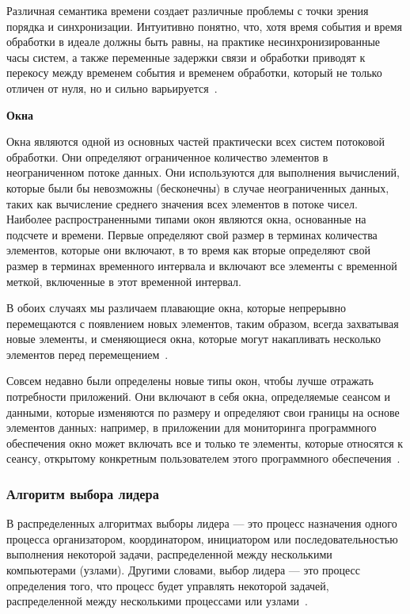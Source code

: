 Различная семантика времени создает различные проблемы с точки зрения порядка и синхронизации. 
Интуитивно понятно, что, хотя время события и время обработки в идеале должны быть равны, на практике несинхронизированные часы систем, а также переменные задержки связи и обработки приводят к перекосу между временем события и временем обработки, который не только отличен от нуля, но и сильно варьируется~\cite{10.14778/2824032.2824076}.

\textbf{Окна}

Окна являются одной из основных частей практически всех систем потоковой обработки. 
Они определяют ограниченное количество элементов в неограниченном потоке данных. 
Они используются для выполнения вычислений, которые были бы невозможны (бесконечны) в случае неограниченных данных, таких как вычисление среднего значения всех элементов в потоке чисел. 
Наиболее распространенными типами окон являются окна, основанные на подсчете и времени. 
Первые определяют свой размер в терминах количества элементов, которые они включают, в то время как вторые определяют свой размер в терминах временного интервала и включают все элементы с временной меткой, включенные в этот временной интервал. 

В обоих случаях мы различаем плавающие окна, которые непрерывно перемещаются с появлением новых элементов, таким образом, всегда захватывая новые элементы, и сменяющиеся окна, которые могут накапливать несколько элементов перед перемещением~\cite{10.14778/1920841.1920874}.

Совсем недавно были определены новые типы окон, чтобы лучше отражать потребности приложений. 
Они включают в себя окна, определяемые сеансом и данными, которые изменяются по размеру и определяют свои границы на основе элементов данных: 
например, в приложении для мониторинга программного обеспечения окно может включать все и только те элементы, которые относятся к сеансу, открытому конкретным пользователем этого программного обеспечения~\cite{10.14778/2824032.2824076}.

\subsubsection{Алгоритм выбора лидера}

В распределенных алгоритмах выборы лидера --- это процесс назначения одного процесса организатором, координатором, инициатором или последовательностью выполнения некоторой задачи, распределенной между несколькими компьютерами (узлами).
Другими словами, выбор лидера --- это процесс определения того, что процесс будет управлять некоторой задачей, распределенной между несколькими процессами или узлами~\cite{leader-krchowdharry}.

